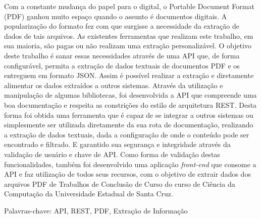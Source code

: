 
\setlength{\absparsep}{18pt} %
\begin{resumo}
 Com a constante mudança do papel para o digital, o Portable Document Format (PDF) ganhou muito espaço quando o assunto é documentos digitais. A popularização do formato fez com que surgisse a necessidade da extração de dados de tais arquivos. As existentes ferramentas que realizam este trabalho, em sua maioria, são pagas ou não realizam uma extração personalizável.
O objetivo deste trabalho é sanar essas necessidades através de uma API que, de forma configurável, permita a extração de dados textuais de documentos PDF e os entreguem em formato JSON. Assim é possível realizar a extração e diretamente alimentar os dados extraídos a outros sistemas.
Através da utilização e manipulação de algumas bibliotecas, foi desenvolvida a API que compreende uma boa documentação e respeita as constrições do estilo de arquitetura REST. Desta forma foi obtida uma ferramenta que é capaz de se integrar a outros sistemas ou simplesmente ser utilizada diretamente da sua rota de documentação, realizando a extração de dados textuais, dada a configuração de onde o conteúdo pode ser encontrado e filtrado. E garantido sua segurança e integridade através da validação de usuário e chave de API. Como forma de validação destas funcionalidades, também foi desenvolvido uma aplicação \textit{front-end} que consome a API e faz utilização de todos seus recursos, com o objetivo de extrair dados dos arquivos PDF de Trabalhos de Conclusão de Curso do curso de Ciência da Computação da Universidade Estadual de Santa Cruz.
\vspace{\onelineskip}
 
\noindent 
Palavras-chave:  API, REST, PDF, Extração de Informação
\end{resumo}

